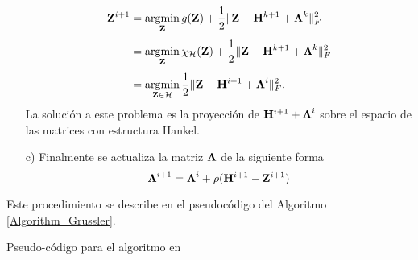 \begin{itemize}
\begin{equation}
                \begin{aligned}
                    \mathbf{Z}^{i+1} & = \operatorname*{\arg\!\min}_{\mathbf{Z}} g(\mathbf{Z}) + \frac{1}{2}\|\mathbf{Z} - \mathbf{H}^{k+1}+\boldsymbol{\Lambda}^{k}\|_F^2\\[0.3em]
                    & = \operatorname*{\arg\!\min}_{\mathbf{Z}} \chi_{\mathcal{H}}(\mathbf{Z}) + \frac{1}{2}\|\mathbf{Z} - \mathbf{H}^{k+1}+\boldsymbol{\Lambda}^{k}\|_F^2\\[0.3em]
                    & = \operatorname*{\arg\!\min}_{\mathbf{Z}\in\mathcal{H}} \frac{1}{2}\|\mathbf{Z} - \mathbf{H}^{i+1}+\boldsymbol{\Lambda}^{i}\|_F^2.
                \end{aligned}
                \label{eq:Grussler9}
            \end{equation}
            La solución a este problema es la proyección de $\mathbf{H}^{i+1}+\boldsymbol{\Lambda}^{i}$ sobre el espacio de las matrices con estructura Hankel.
            \item[c)] Finalmente se actualiza la matriz $\boldsymbol{\Lambda}$ de la siguiente forma
            \begin{equation}
                \boldsymbol{\Lambda}^{i+1} = \boldsymbol{\Lambda}^{i} + \rho(\mathbf{H}^{i+1}-\mathbf{Z}^{i+1})
                \label{eq:Grussler10}
            \end{equation}
        \end{itemize}
        
        Este procedimiento se describe en el pseudocódigo del Algoritmo \eqref{Algorithm_Grussler}.
        
		\begin{algorithm}
			\caption{Pseudo-código para el algoritmo en \cite{Grussler2018}}
			\begin{algorithmic}[1]
				\EndWhile	
			\end{algorithmic}
			\label{Algorithm_Grussler}
		\end{algorithm} 
		
